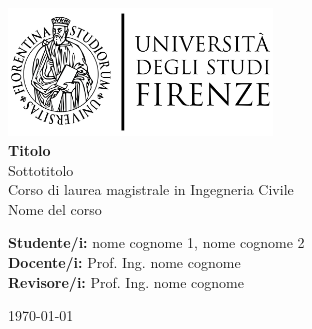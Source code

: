 
\begin{titlepage}
    \begin{center}
        \vspace{1cm}
        \includegraphics[width=7cm]{img/logo_unifi.png} \\[4cm] %
        
        {\huge \textbf{Titolo}}\\[0.5cm]
        
        {\Large Sottotitolo}\\[1cm]
        
        {\large Corso di laurea magistrale in Ingegneria Civile}\\[0.5cm]
        {\large Nome del corso}\\
    \end{center}

    \vfill

    \begin{flushleft}
        \textbf{Studente/i:} nome cognome 1, nome cognome 2 \\ 
        \textbf{Docente/i:} Prof. Ing. nome cognome\\ 
        \textbf{Revisore/i:} Prof. Ing. nome cognome \\[4cm]
    \end{flushleft}

    \vfill

    \begin{center}
	    \today %
	\end{center}


\end{titlepage}
